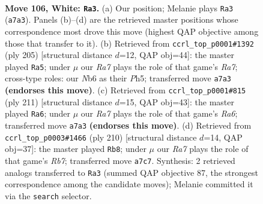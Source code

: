 \documentclass[11pt]{article}
\begin{document}
\clearpage

\begin{figure}[p]\centering
\begin{subfigure}{0.46\textwidth}\centering
\resizebox{\linewidth}{!}{%
\newchessgame
\chessboard[
  setfen={8/R5pk/1N3p2/7p/7P/6PK/5r2/8 w - - 36 106},
  showmover=false,
  pgfstyle=straightmove, color=movearrow, markmove={a7-a3}
]}
\caption{}
\end{subfigure}\hfill
\begin{subfigure}{0.46\textwidth}\centering
\resizebox{\linewidth}{!}{%
\newchessgame
\chessboard[
  setfen={1R6/5pk1/6p1/7p/7P/6P1/r4PK1/8 b - - 24 103},
  showmover=false,
  pgfstyle=straightmove, color=movearrow, markmove={a2-a5}
]}
\caption{}
\end{subfigure}
\\[4pt]
\begin{subfigure}{0.46\textwidth}\centering
\resizebox{\linewidth}{!}{%
\newchessgame
\chessboard[
  setfen={8/5pk1/5p2/7P/6P1/r4PK1/8/1R6 b - - 46 106},
  showmover=false,
  pgfstyle=straightmove, color=movearrow, markmove={a3-a6}
]}
\caption{}
\end{subfigure}\hfill
\begin{subfigure}{0.46\textwidth}\centering
\resizebox{\linewidth}{!}{%
\newchessgame
\chessboard[
  setfen={8/1R3pk1/4p3/4P1P1/4KP2/r7/8/8 w - - 27 106},
  showmover=false,
  pgfstyle=straightmove, color=movearrow, markmove={b7-b8}
]}
\caption{}
\end{subfigure}
\caption{\textbf{Move 106, White: \texttt{Ra3}.} (a) Our position; Melanie plays \texttt{Ra3} (\texttt{a7a3}). Panels (b)--(d) are the retrieved master positions whose correspondence most drove this move (highest QAP objective among those that transfer to it). (b) Retrieved from \texttt{ccrl\_top\_p0001\#1392} (ply 205) [structural distance $d$=12, QAP obj=44]: the master played \texttt{Ra5}; under $\mu$ our \emph{Ra7} plays the role of that game's \emph{Ra7}; cross-type roles: our \emph{N}b6 as their \emph{P}h5; transferred move \texttt{a7a3} \textbf{(endorses this move)}. (c) Retrieved from \texttt{ccrl\_top\_p0001\#815} (ply 211) [structural distance $d$=15, QAP obj=43]: the master played \texttt{Ra6}; under $\mu$ our \emph{Ra7} plays the role of that game's \emph{Ra6}; transferred move \texttt{a7a3} \textbf{(endorses this move)}. (d) Retrieved from \texttt{ccrl\_top\_p0003\#1466} (ply 210) [structural distance $d$=14, QAP obj=37]: the master played \texttt{Rb8}; under $\mu$ our \emph{Ra7} plays the role of that game's \emph{Rb7}; transferred move \texttt{a7c7}. Synthesis: 2 retrieved analogs transferred to \texttt{Ra3} (summed QAP objective 87, the strongest correspondence among the candidate moves); Melanie committed it via the \texttt{search} selector.}
\label{fig:thought-m210}
\end{figure}
\end{document}
